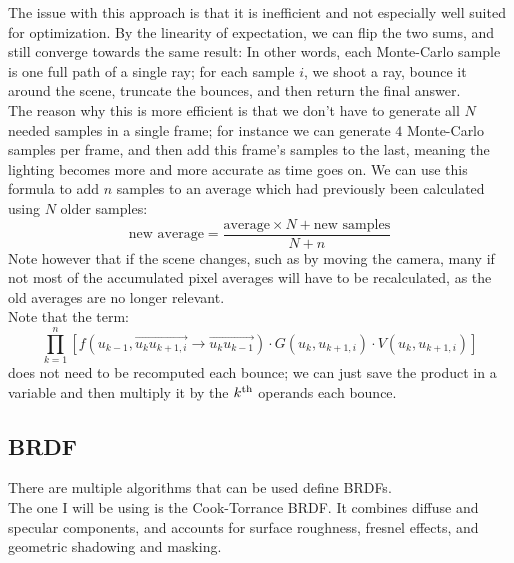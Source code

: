 \documentclass[12pt]{article}
\begin{document}
The issue with this approach is that it is inefficient
and not especially well suited for optimization.
By the linearity of expectation, we can flip
the two sums, and still converge towards the same 
result:
In other words, each Monte-Carlo sample is one full
path of a single ray; for each sample $i$,
we shoot a ray, bounce it around the scene,
truncate the bounces, and then return the final answer. \\

The reason why this is more efficient is that we 
don't have to generate all $N$ needed samples in a 
single frame; for instance we can generate $4$
Monte-Carlo samples per frame, and then add
this frame's samples to the last, meaning the lighting
becomes more and more accurate as time goes on.
We can use this formula to add $n$ samples to an average
which had previously been calculated using $N$
older samples:
\[ \text{new average} = 
\dfrac{\text{average} \times N + 
\text{new samples}}{N + n} \]
Note however that if the scene changes, such as by moving
the camera, many if not most of the accumulated
pixel averages will have to be recalculated,
as the old averages are no longer relevant. \\

Note that the term:
\[ \prod_{k=1}^{n} 
\left[ f(u_{k-1}, \overset{\rightarrow}{u_k u_{k+1, i}} 
    \to \overset{\rightarrow}{u_k u_{k-1}})  \cdot 
G(u_k, u_{k+1, i}) \cdot V(u_k, u_{k+1, i}) \right] \]
does not need to be recomputed each bounce;
we can just save the product in a variable
and then multiply it by the $k^{\text{th}}$
operands each bounce. \\

\newpage

\subsection*{BRDF}

There are multiple algorithms that can be used define
BRDFs. \\
The one I will be using is the Cook-Torrance BRDF.
It combines diffuse and specular components, 
and accounts for surface roughness, 
fresnel effects, and geometric shadowing and masking. \\
\end{document}
